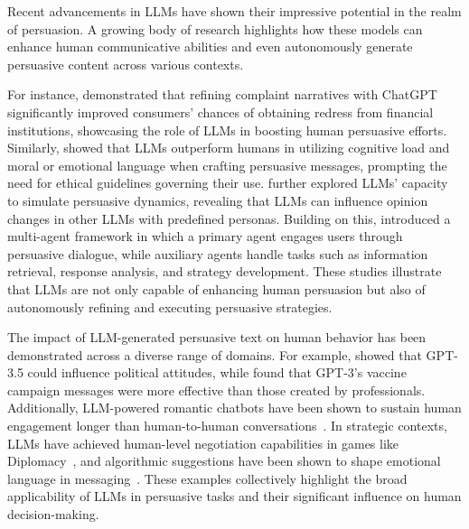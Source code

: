 

Recent advancements in LLMs have shown their impressive potential in the realm of persuasion. 
A growing body of research highlights how these models can enhance human communicative abilities and even autonomously generate persuasive content across various contexts.

For instance, \citet{shin2024large} demonstrated that refining complaint narratives with ChatGPT significantly improved consumers' chances of obtaining redress from financial institutions, showcasing the role of LLMs in boosting human persuasive efforts. 
Similarly, \citet{carrasco2024large} showed that LLMs outperform humans in utilizing cognitive load and moral or emotional language when crafting persuasive messages, prompting the need for ethical guidelines governing their use. 
\citet{breum2024persuasive} further explored LLMs' capacity to simulate persuasive dynamics, revealing that LLMs can influence opinion changes in other LLMs with predefined personas. 
Building on this, \citet{ramani2024persuasion} introduced a multi-agent framework in which a primary agent engages users through persuasive dialogue, while auxiliary agents handle tasks such as information retrieval, response analysis, and strategy development.
These studies illustrate that LLMs are not only capable of enhancing human persuasion but also of autonomously refining and executing persuasive strategies.

The impact of LLM-generated persuasive text on human behavior has been demonstrated across a diverse range of domains. 
For example, \citet{bai_voelkel_eichstaedt_willer_2023} showed that GPT-3.5 could influence political attitudes, while \citet{karinshak2023working} found that GPT-3’s vaccine campaign messages were more effective than those created by professionals. 
Additionally, LLM-powered romantic chatbots have been shown to sustain human engagement longer than human-to-human conversations~\citep{zhou2020design}. 
In strategic contexts, LLMs have achieved human-level negotiation capabilities in games like Diplomacy~\citep{meta2022human}, and algorithmic suggestions have been shown to shape emotional language in messaging~\citep{hohenstein2023artificial}. 
These examples collectively highlight the broad applicability of LLMs in persuasive tasks and their significant influence on human decision-making.


